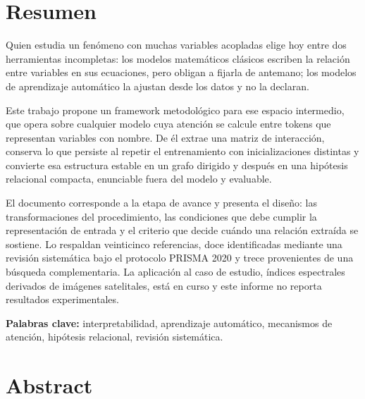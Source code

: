 
\chapter*{Resumen}
{}

Quien estudia un fenómeno con muchas variables acopladas elige hoy entre dos herramientas incompletas: los modelos matemáticos clásicos escriben la relación entre variables en sus ecuaciones, pero obligan a fijarla de antemano; los modelos de aprendizaje automático la ajustan desde los datos y no la declaran.

Este trabajo propone un framework metodológico para ese espacio intermedio, que opera sobre cualquier modelo cuya atención se calcule entre tokens que representan variables con nombre. De él extrae una matriz de interacción, conserva lo que persiste al repetir el entrenamiento con inicializaciones distintas y convierte esa estructura estable en un grafo dirigido y después en una hipótesis relacional compacta, enunciable fuera del modelo y evaluable.

El documento corresponde a la etapa de avance y presenta el diseño: las transformaciones del procedimiento, las condiciones que debe cumplir la representación de entrada y el criterio que decide cuándo una relación extraída se sostiene. Lo respaldan veinticinco referencias, doce identificadas mediante una revisión sistemática bajo el protocolo PRISMA 2020 y trece provenientes de una búsqueda complementaria. La aplicación al caso de estudio, índices espectrales derivados de imágenes satelitales, está en curso y este informe no reporta resultados experimentales.

{\bf Palabras clave:} interpretabilidad, aprendizaje automático, mecanismos de atención, hipótesis relacional, revisión sistemática.

\begingroup
\let\clearpage\relax
\chapter*{Abstract}

